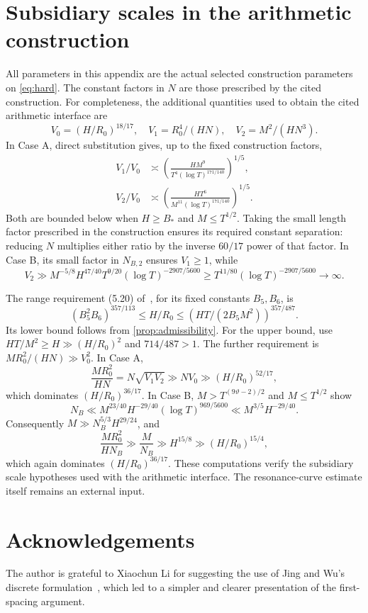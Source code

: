 \documentclass[11pt,reqno]{amsart}
\numberwithin{equation}{section}
\theoremstyle{definition}
\theoremstyle{remark}
\newcommand{\vth}{\vartheta}
\begin{document}
\section{Subsidiary scales in the arithmetic construction}\label{app:construction}
All parameters in this appendix are the actual selected construction parameters on \eqref{eq:hard}. The constant factors in $N$ are those prescribed by the cited construction.
For completeness, the additional quantities used to obtain the cited arithmetic interface are
\[
 V_0=(H/R_0)^{18/17},\quad V_1=R_0^4/(HN),\quad V_2=M^2/(HN^3).
\]
In Case A, direct substitution gives, up to the fixed construction factors,
\begin{align}
 V_1/V_0&\asymp
 \left(\frac{HM^9}{T^4(\log T)^{171/140}}\right)^{1/5},\\
 V_2/V_0&\asymp
 \left(\frac{HT^6}{M^{11}(\log T)^{171/140}}\right)^{1/5}.
\end{align}
Both are bounded below when $H\ge B_*$ and $M\le T^{1/2}$. Taking the small length factor prescribed in the construction ensures its required constant separation: reducing $N$ multiplies either ratio by the inverse $60/17$ power of that factor.
In Case B, its small factor in $N_{B,2}$ ensures $V_1\ge1$, while
\[
 V_2\gg M^{-5/8}H^{47/40}T^{9/20}(\log T)^{-2907/5600}
 \ge T^{11/80}(\log T)^{-2907/5600}\to\infty.
\]

The range requirement (5.20) of~\cite{BW17}, for its fixed constants $B_5,B_6$, is
\[
 (B_5^2B_6)^{357/113}\le H/R_0
 \le\left(HT/(2B_5M^2)\right)^{357/487}.
\]
Its lower bound follows from \cref{prop:admissibility}. For the upper bound, use
$HT/M^2\ge H\gg(H/R_0)^2$ and $714/487>1$.
The further requirement is $MR_0^2/(HN)\gg V_0^2$.
In Case A,
\[
 \frac{MR_0^2}{HN}=N\sqrt{V_1V_2}
 \gg NV_0\gg (H/R_0)^{52/17},
\]
which dominates $(H/R_0)^{36/17}$.
In Case B, $M>T^{(9\vth-2)/2}$ and $M\le T^{1/2}$ show
\[
 N_B\ll M^{23/40}H^{-29/40}(\log T)^{969/5600}
 \ll M^{3/5}H^{-29/40}.
\]
Consequently $M\gg N_B^{5/3}H^{29/24}$, and
\[
 \frac{MR_0^2}{HN_B}\gg \frac M{N_B}
 \gg H^{15/8}\gg(H/R_0)^{15/4},
\]
which again dominates $(H/R_0)^{36/17}$.
These computations verify the subsidiary scale hypotheses used with the arithmetic interface. The resonance-curve estimate itself remains an external input.


\section*{Acknowledgements}
The author is grateful to Xiaochun Li for suggesting the use of Jing and Wu's
discrete formulation~\cite{JW}, which led to a simpler and clearer presentation
of the first-spacing argument.
\end{document}

